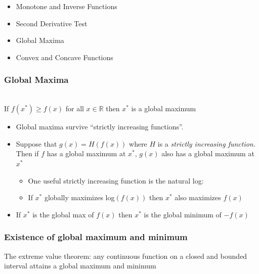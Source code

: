 \documentclass[aspectratio=169, handout]{beamer}
\numberwithin{equation}{section}
\begin{document}
\begin{frame}

\begin{itemize}
\item \textcolor{mygray}{Monotone and Inverse Functions}

\item \textcolor{mygray}{Second Derivative Test}
\item \textcolor{myblack}{Global Maxima}
\item \textcolor{mygray}{Convex and Concave Functions}
\end{itemize}

\end{frame}



\begin{frame}
\frametitle{Global Maxima}

\ \\If $f(x^*)\geq f(x)$ for all $x\in \mathbb{R}$ then $x^*$ is a global maximum \pause

\begin{itemize}
\item Global maxima survive ``strictly increasing functions''.\pause
\item[-] Suppose that $g(x)=H(f(x))$ where $H$ is a \textit{strictly increasing function}.  Then if $f$ has a global maximum at $x^*$, $g(x)$ also has a global maximum at $x^*$ \pause
\begin{itemize}
\item One useful strictly increasing function is the natural log:
\item If $x^*$ globally maximizes log$(f(x))$ then $x^*$ also maximizes $f(x)$ \pause
\end{itemize}

\item If $x^*$ is the global max of $f(x)$ then $x^*$ is the global minimum of $-f(x)$ \pause
\end{itemize}

\end{frame}



\begin{frame}
\frametitle{Existence of global maximum and minimum}

\begin{theorem}
The extreme value theorem:  any continuous function on a closed and bounded interval attains a global maximum and minimum
\end{theorem} \pause

\end{frame}
\end{document}
